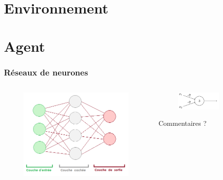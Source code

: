 \documentclass{beamer}
\begin{document}
\section{Environnement}

\section{Agent}

\begin{frame}
    \frametitle{Réseaux de neurones}
    \begin{columns}[T]
        \begin{column}{.48\textwidth}
            \begin{figure}
                \includegraphics[width=\textwidth]{neuralnet.png}
            \end{figure}
        \end{column}
        \begin{column}{.48\textwidth}
            \begin{figure}
                \includegraphics[width=0.8\textwidth]{neuron.png}
            \end{figure}
            \begin{block}{}
                \center
                Commentaires ?
            \end{block}
        \end{column}
    \end{columns}
\end{frame}
\end{document}

